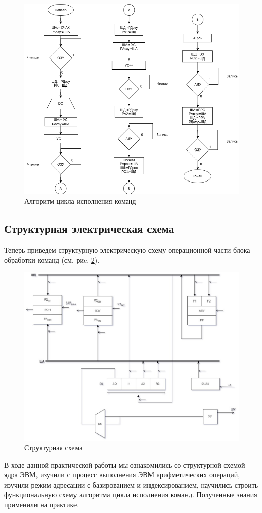 \documentclass[a4paper,14pt]{extarticle}
\begin{document}
\begin{figure}[htbp]
	\centering
	\includegraphics[width=0.6\linewidth]{images/func-alg3}
	\caption{Алгоритм цикла исполнения команд}
	\label{fig:func-alg}
\end{figure}
\newpage

\subsection{Структурная электрическая схема}
Теперь приведем структурную электрическую схему операционной части блока обработки команд (см. риc. \ref{fig:unit}).
\begin{figure}[htpb]
	\centering
	\includegraphics[width=0.6\linewidth]{images/unit}
	\caption{Структурная схема}
	\label{fig:unit}
\end{figure}


В ходе данной практической работы мы ознакомились со структурной схемой ядра ЭВМ, изучили с процесс выполнения ЭВМ арифметических операций, изучили режим адресации с базированием и индексированием, научились строить функциональную схему алгоритма цикла исполнения команд. Полученные знания применили на практике.
\end{document}
